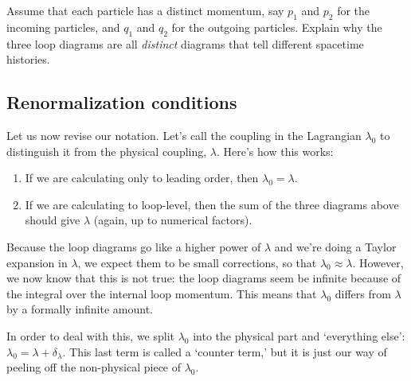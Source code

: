 \documentclass[12pt]{article}
\numberwithin{equation}{section}    %
\begin{document}
Assume that each particle has a distinct momentum, say $p_1$ and $p_2$ for the incoming particles, and $q_1$ and $q_2$ for the outgoing particles. Explain why the three loop diagrams are all \emph{distinct} diagrams that tell different spacetime histories. 

\subsection{Renormalization conditions}

Let us now revise our notation. Let's call the coupling in the Lagrangian $\lambda_0$ to distinguish it from the physical coupling, $\lambda$. Here's how this works:
\begin{enumerate}
	\item If we are calculating only to leading order, then $\lambda_0 = \lambda$.
	\item If we are calculating to loop-level, then the sum of the three diagrams above should give $\lambda$ (again, up to numerical factors). 
\end{enumerate}
Because the loop diagrams go like a higher power of $\lambda$ and we're doing a Taylor expansion in $\lambda$, we expect them to  be small corrections, so that $\lambda_0\approx \lambda$. However, we now know that this is not true: the loop diagrams seem be infinite because of the integral over the internal loop momentum. This means that $\lambda_0$ differs from $\lambda$ by a formally infinite amount. 

In order to deal with this, we split $\lambda_0$ into the physical part and `everything else': $\lambda_0 = \lambda + \delta_\lambda$. This last term is called a `counter term,' but it is just our way of peeling off the non-physical piece of $\lambda_0$. 
\end{document}
